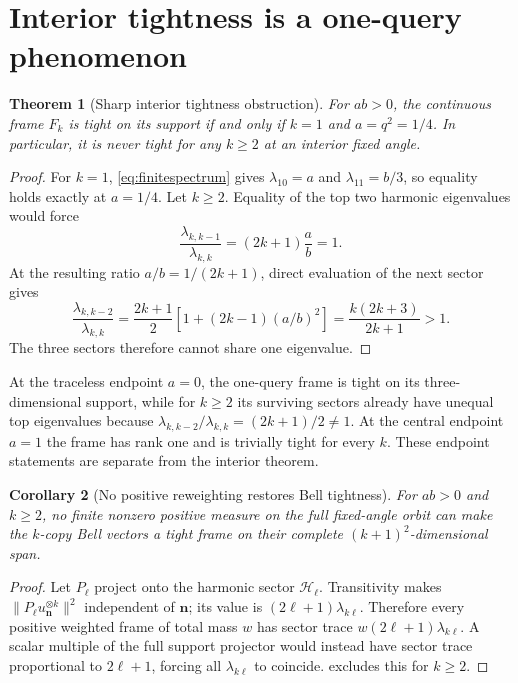 \documentclass[11pt]{article}
\newtheorem{theorem}{Theorem}[section]
\newtheorem{corollary}[theorem]{Corollary}
\theoremstyle{definition}
\theoremstyle{remark}
\newcommand{\cH}{\mathcal H}
\begin{document}
\section{Interior tightness is a one-query phenomenon}

\begin{theorem}[Sharp interior tightness obstruction]\label{thm:notight}
For $ab>0$, the continuous frame $F_k$ is tight on its support if and only if
$k=1$ and $a=q^2=1/4$.  In particular, it is never tight for any
$k\geq2$ at an interior fixed angle.
\end{theorem}

\begin{proof}
For $k=1$, \cref{eq:finitespectrum} gives
$\lambda_{10}=a$ and $\lambda_{11}=b/3$, so equality holds exactly at
$a=1/4$.  Let $k\geq2$.  Equality of the top two harmonic eigenvalues would
force
\begin{equation}
 \frac{\lambda_{k,k-1}}{\lambda_{k,k}}
 =(2k+1)\frac ab=1.
\end{equation}
At the resulting ratio $a/b=1/(2k+1)$, direct evaluation of the next sector
gives
\begin{equation}
 \frac{\lambda_{k,k-2}}{\lambda_{k,k}}
 =\frac{2k+1}{2}\left[1+(2k-1)(a/b)^2\right]
 =\frac{k(2k+3)}{2k+1}>1.
\end{equation}
The three sectors therefore cannot share one eigenvalue.
\end{proof}

At the traceless endpoint $a=0$, the one-query frame is tight on its
three-dimensional support, while for $k\geq2$ its surviving sectors already
have unequal top eigenvalues because
$\lambda_{k,k-2}/\lambda_{k,k}=(2k+1)/2\neq1$.  At the central endpoint
$a=1$ the frame has rank one and is trivially tight for every $k$.  These
endpoint statements are separate from the interior theorem.

\begin{corollary}[No positive reweighting restores Bell tightness]
\label{cor:noreweight}
For $ab>0$ and $k\geq2$, no finite nonzero positive measure on the full fixed-angle orbit
can make the $k$-copy Bell vectors a tight frame on their complete
$(k+1)^2$-dimensional span.
\end{corollary}

\begin{proof}
Let $P_\ell$ project onto the harmonic sector $\cH_\ell$.  Transitivity makes
$\|P_\ell u_{\bm n}^{\otimes k}\|^2$ independent of $\bm n$; its value is
$(2\ell+1)\lambda_{k\ell}$.  Therefore every positive weighted frame of total
mass $w$ has sector trace $w(2\ell+1)\lambda_{k\ell}$.  A scalar multiple of
the full support projector would instead have sector trace proportional to
$2\ell+1$, forcing all $\lambda_{k\ell}$ to coincide.
 excludes this for $k\geq2$.
\end{proof}
\end{document}
